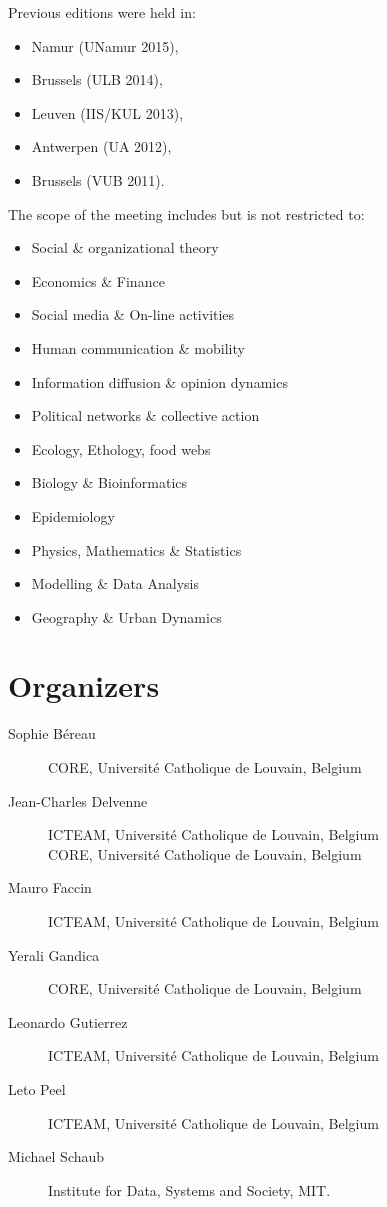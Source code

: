 \documentclass[12pt, a4paper]{scrbook}
\begin{document}
Previous editions were held in:
\begin{itemize}
  \item Namur (UNamur 2015),
  \item Brussels (ULB 2014),
  \item Leuven (IIS/KUL 2013),
  \item Antwerpen (UA 2012),
  \item Brussels (VUB 2011).
\end{itemize}

The scope of the meeting includes but is not restricted to:

\begin{itemize}
  \item  Social \& organizational theory
  \item  Economics \& Finance
  \item  Social media \& On-line activities
  \item  Human communication \& mobility
  \item  Information diffusion \& opinion dynamics
  \item  Political networks \& collective action
  \item  Ecology, Ethology, food webs
  \item  Biology \& Bioinformatics
  \item  Epidemiology
  \item  Physics, Mathematics \& Statistics
  \item  Modelling \& Data Analysis
  \item  Geography \& Urban Dynamics
\end{itemize}

\section*{Organizers}

\newcommand{\icteam}{ICTEAM, Université Catholique de Louvain, Belgium}
\newcommand{\core}{CORE, Université Catholique de Louvain, Belgium}
\begin{description}
  \item[Sophie Béreau]
    \core%
  \item[Jean-Charles Delvenne]
    \icteam\\
    \core%
  \item[Mauro Faccin]
    \icteam%
  \item[Yerali Gandica]
    \core%
  \item[Leonardo Gutierrez]
    \icteam%
  \item[Leto Peel]
    \icteam%
  \item[Michael Schaub]
    Institute for Data, Systems and Society, MIT.
\end{description}
\end{document}
